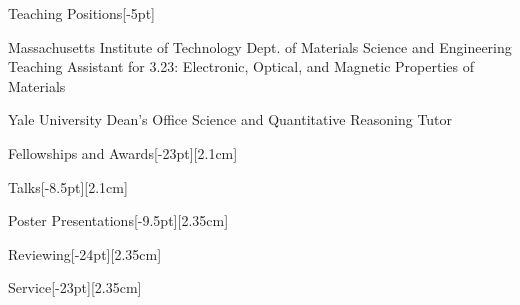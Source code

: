 \documentclass{cv} %
\begin{document}
\begin{cvSection}{Teaching Positions}[-5pt]

    {Massachusetts Institute of Technology}
    {Dept. of Materials Science and Engineering}
    {Teaching Assistant for 3.23: Electronic, Optical, and Magnetic Properties of Materials}

    {Yale University}
    {Dean's Office}
    {Science and Quantitative Reasoning Tutor}

\end{cvSection}

\vspace{-5mm}
\begin{cvSection}{Fellowships and Awards}[-23pt][2.1cm]
    
\end{cvSection}

\begin{pubsSection}[-8pt][2.1cm]
    
\end{pubsSection}


\begin{cvSection}{Talks}[-8.5pt][2.1cm]
    
\end{cvSection}

\begin{cvSection}{Poster Presentations}[-9.5pt][2.35cm]
    
\end{cvSection}

\begin{cvSection}{Reviewing}[-24pt][2.35cm]
\end{cvSection}


\begin{cvSection}{Service}[-23pt][2.35cm]
    
\end{cvSection}
\end{document}
